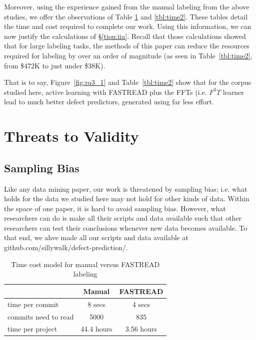 \documentclass[10pt,journal,compsoc]{IEEEtran}
\newcommand{\fig}[1]{Figure~\ref{fig:#1}}
\newcommand{\tion}[1]{\S\ref{tion:#1}}
\begin{document}
 




Moreover, using the experience gained from the manual labeling from the above studies, we offer the observations
of Table \ref{tbl:time1} and \ref{tbl:time2}.
These tables  detail the time and cost required
to complete our work. Using this information, we can now
justify the calculations of \tion{iia}.
Recall that those calculations showed that for large
labeling tasks, the methods of this paper can reduce the
resources required for labeling by over an order of magnitude
(as seen in Table~\ref{tbl:time2}, from \$472K to just under \$38K).

That is to say, 
\fig{rq3_1}  and  Table~\ref{tbl:time2} show that for the corpus
studied here, active learning with FASTREAD plus the
FFTs (i.e. $F^3T$ learner lead to much better defect predictors,
generated using far less effort.




\section{Threats to Validity }

\subsection{Sampling Bias}

Like any data mining paper,
our work is threatened by  sampling bias; i.e.  what holds for the data we studied here may
not hold for other kinds of data. 
Within the space of one paper, it is hard to avoid sampling bias.
However, what researchers can do is make all their scripts and data available
such that other researchers can test their conclusions whenever new data becomes available. To that end, we ahve made all our scripts and data available at github.com/sillywalk/defect-prediction/.

\begin{table}[!t]
\vspace{-10pt}
\caption{Time cost model for manual versus FASTREAD labeling}
\vspace{-10pt}
\label{tbl:time1}
 
\begin{center}
\begin{tabular}{ l|c|c }
 \multicolumn{1}{c|}{} & \multicolumn{1}{c|}{Manual} & \multicolumn{1}{c}{FASTREAD}\\
\hline
time per commit & 8 secs & 4 secs \\
commits need to read & 5000 & 835 \\
time per project & 44.4 hours & 3.56 hours \\
\end{tabular}
\end{center}
\vspace{-1mm}
\end{table}
\end{document}
